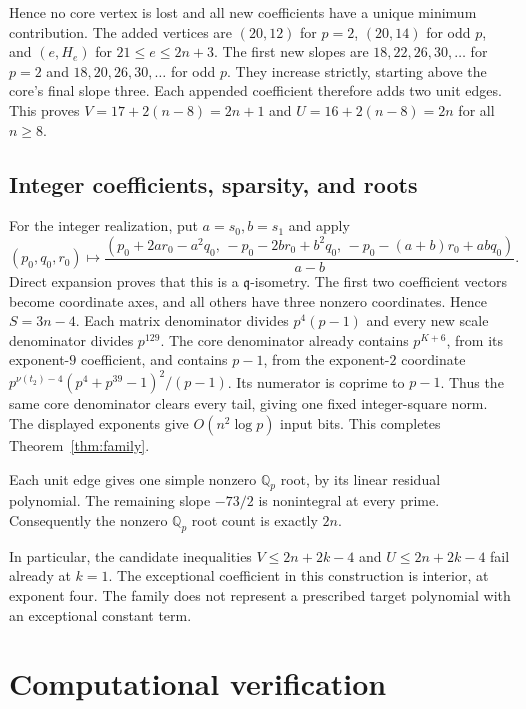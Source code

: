 \documentclass[11pt]{article}
\theoremstyle{remark}\newtheorem{remark}[theorem]{Remark}
\newcommand{\val}{\nu}
\newcommand{\qf}{\mathfrak q}
\newcommand{\Q}{\mathbb Q}
\begin{document}
Hence no core vertex is lost and all new coefficients have a unique
minimum contribution. The added vertices are $(20,12)$ for $p=2$,
$(20,14)$ for odd $p$, and $(e,H_e)$ for $21\le e\le2n+3$.
The first new slopes are $18,22,26,30,\ldots$ for $p=2$ and
$18,20,26,30,\ldots$ for odd $p$. They increase strictly, starting
above the core's final slope three. Each appended coefficient therefore
adds two unit edges. This proves $V=17+2(n-8)=2n+1$ and
$U=16+2(n-8)=2n$ for all $n\ge8$.

\subsection{Integer coefficients, sparsity, and roots}

For the integer realization, put $a=s_0,b=s_1$ and apply
\begin{equation}\label{eq:strongeriso}
(p_0,q_0,r_0)\longmapsto
\frac{(p_0+2ar_0-a^2q_0,\,
       -p_0-2br_0+b^2q_0,\,
       -p_0-(a+b)r_0+abq_0)}{a-b}.
\end{equation}
Direct expansion proves that this is a $\qf$-isometry.
The first two coefficient vectors become coordinate axes, and all
others have three nonzero coordinates. Hence $S=3n-4$.
Each matrix denominator divides $p^4(p-1)$ and every new scale
denominator divides $p^{129}$. The core denominator already contains
$p^{K+6}$, from its exponent-$9$ coefficient, and contains $p-1$,
from the exponent-$2$ coordinate
$p^{\val(t_2)-4}(p^4+p^{39}-1)^2/(p-1)$.
Its numerator is coprime to $p-1$.
Thus the same core denominator clears every tail, giving one fixed
integer-square norm. The displayed exponents give $O(n^2\log p)$ input bits.
This completes Theorem~\ref{thm:family}.

Each unit edge gives one simple nonzero $\Q_p$ root, by its linear
residual polynomial. The remaining slope $-73/2$ is nonintegral
at every prime. Consequently the nonzero $\Q_p$ root count is
exactly $2n$.



In particular, the candidate inequalities $V\le2n+2k-4$ and
$U\le2n+2k-4$ fail already at $k=1$. The exceptional coefficient in
this construction is interior, at exponent four. The family does not
represent a prescribed target polynomial with an exceptional constant term.

\section{Computational verification}
\end{document}
